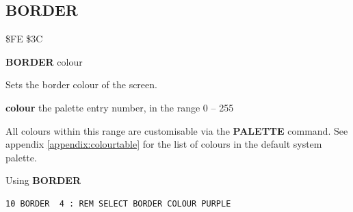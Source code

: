 
\newpage
\subsection{BORDER}
\begin{description}[leftmargin=2cm,style=nextline]
\item [Token:] \$FE \$3C
\item [Format:] {\bf BORDER} colour
\item [Usage:] Sets the border colour
               of the screen.

               {\bf colour} the palette entry number, in the range 0 -- 255

               All colours within this range are customisable via the {\bf
               PALETTE} command. See appendix \vref{appendix:colourtable} for
               the list of colours in the default system palette.

\item [Example:] Using {\bf BORDER}
\begin{tcolorbox}[colback=black,coltext=white]
\verbatimfont{\codefont}
\begin{verbatim}
10 BORDER  4 : REM SELECT BORDER COLOUR PURPLE
\end{verbatim}
\end{tcolorbox}
\end{description}


\newpage
